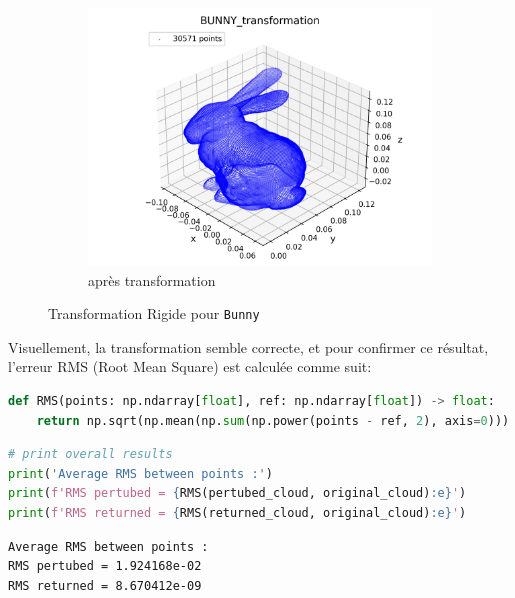 \documentclass[../5RO17_TP4.tex]{subfiles}
\begin{document}
\begin{figure}[H]
\begin{subfigure}[b]{0.325\textwidth}
        \centering
        \includegraphics[width=\linewidth]{images/BUNNY_transformation.png}
        \caption{après transformation}
        \label{}
    \end{subfigure}
    \caption{Transformation Rigide pour \texttt{Bunny}}
    \label{}
\end{figure}
\noindent Visuellement, la transformation semble correcte, et pour confirmer ce résultat, l'erreur RMS (Root Mean Square) est calculée comme suit:\\

\begin{scriptsize}\mycode
	\begin{lstlisting}[language=Python, caption=\texttt{RMS()}]
def RMS(points: np.ndarray[float], ref: np.ndarray[float]) -> float:
    return np.sqrt(np.mean(np.sum(np.power(points - ref, 2), axis=0)))
	\end{lstlisting}
\end{scriptsize}
\begin{scriptsize}\mycode
	\begin{lstlisting}[language=Python, caption=\text{Execution \texttt{main()}}]
# print overall results
print('Average RMS between points :')
print(f'RMS pertubed = {RMS(pertubed_cloud, original_cloud):e}')
print(f'RMS returned = {RMS(returned_cloud, original_cloud):e}')
	\end{lstlisting}
\end{scriptsize}
\begin{scriptsize}\mycode
	\begin{lstlisting}[language=Bash]
Average RMS between points :
RMS pertubed = 1.924168e-02
RMS returned = 8.670412e-09
	\end{lstlisting}
\end{scriptsize}
\end{document}
